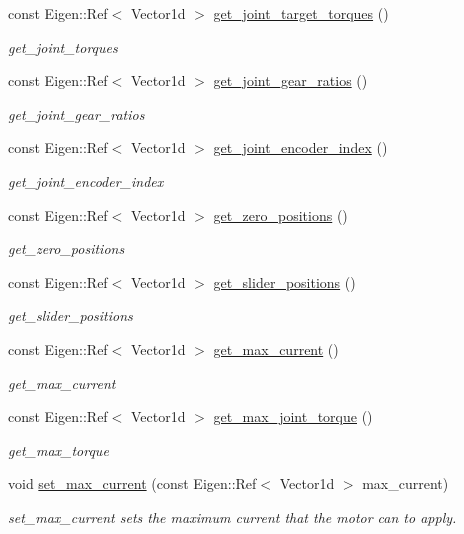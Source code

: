 \begin{DoxyCompactItemize}
const Eigen\+::\+Ref$<$ Vector1d $>$ \hyperlink{classblmc__robots_1_1SingleMotor_a261200917e713211fa7652b1157eafa1}{get\+\_\+joint\+\_\+target\+\_\+torques} ()
\begin{DoxyCompactList}\small\item\em get\+\_\+joint\+\_\+torques \end{DoxyCompactList}\item 
const Eigen\+::\+Ref$<$ Vector1d $>$ \hyperlink{classblmc__robots_1_1SingleMotor_a8ec5c8ba70bc93ff728300e868755546}{get\+\_\+joint\+\_\+gear\+\_\+ratios} ()
\begin{DoxyCompactList}\small\item\em get\+\_\+joint\+\_\+gear\+\_\+ratios \end{DoxyCompactList}\item 
const Eigen\+::\+Ref$<$ Vector1d $>$ \hyperlink{classblmc__robots_1_1SingleMotor_ab73b8091a40e846a1b6c08ac1d8e0db8}{get\+\_\+joint\+\_\+encoder\+\_\+index} ()
\begin{DoxyCompactList}\small\item\em get\+\_\+joint\+\_\+encoder\+\_\+index \end{DoxyCompactList}\item 
const Eigen\+::\+Ref$<$ Vector1d $>$ \hyperlink{classblmc__robots_1_1SingleMotor_a3a753c2c1b7b82bd716caa4fc3b5f5f0}{get\+\_\+zero\+\_\+positions} ()
\begin{DoxyCompactList}\small\item\em get\+\_\+zero\+\_\+positions \end{DoxyCompactList}\item 
const Eigen\+::\+Ref$<$ Vector1d $>$ \hyperlink{classblmc__robots_1_1SingleMotor_a9c0f3d4686e13d2a8a668a8c26f0bd00}{get\+\_\+slider\+\_\+positions} ()
\begin{DoxyCompactList}\small\item\em get\+\_\+slider\+\_\+positions \end{DoxyCompactList}\item 
const Eigen\+::\+Ref$<$ Vector1d $>$ \hyperlink{classblmc__robots_1_1SingleMotor_a5768cce6fef657b36648ea68fdbb3ed8}{get\+\_\+max\+\_\+current} ()
\begin{DoxyCompactList}\small\item\em get\+\_\+max\+\_\+current \end{DoxyCompactList}\item 
const Eigen\+::\+Ref$<$ Vector1d $>$ \hyperlink{classblmc__robots_1_1SingleMotor_af83ef444bdd1eebdac1df6d8035d2b75}{get\+\_\+max\+\_\+joint\+\_\+torque} ()
\begin{DoxyCompactList}\small\item\em get\+\_\+max\+\_\+torque \end{DoxyCompactList}\item 
void \hyperlink{classblmc__robots_1_1SingleMotor_af2add59e3d08949c658568b6d161b5ba}{set\+\_\+max\+\_\+current} (const Eigen\+::\+Ref$<$ Vector1d $>$ max\+\_\+current)
\begin{DoxyCompactList}\small\item\em set\+\_\+max\+\_\+current sets the maximum current that the motor can to apply. \end{DoxyCompactList}\end{DoxyCompactItemize}
